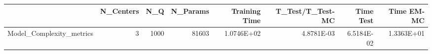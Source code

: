 \begin{tabular}{lrrrrrrr}
\toprule
{} &  N\_Centers &   N\_Q &  N\_Params &  Training Time &  T\_Test/T\_Test-MC &  Time Test &  Time EM-MC \\
\midrule
Model\_Complexity\_metrics &          3 &  1000 &     81603 &     1.0746E+02 &        4.8781E-03 & 6.5184E-02 &  1.3363E+01 \\
\bottomrule
\end{tabular}
